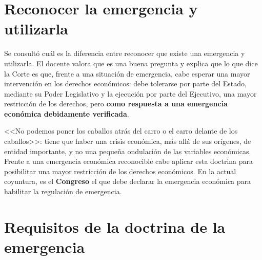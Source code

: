 \documentclass[12pt,oneside]{book}
\begin{document}
\section{Reconocer la emergencia y utilizarla}

Se consultó cuál es la diferencia entre reconocer que existe una emergencia y utilizarla. El docente valora que es una buena pregunta y explica que lo que dice la Corte es que, frente a una situación de emergencia, cabe esperar una mayor intervención en los derechos económicos: debe tolerarse por parte del Estado, mediante su Poder Legislativo y la ejecución por parte del Ejecutivo, una mayor restricción de los derechos, pero \textbf{como respuesta a una emergencia económica debidamente verificada}.

<<No podemos poner los caballos atrás del carro o el carro delante de los caballos>>: tiene que haber una crisis económica, más allá de sus orígenes, de entidad importante, y no una pequeña ondulación de las variables económicas. Frente a una emergencia económica reconocible cabe aplicar esta doctrina para posibilitar una mayor restricción de los derechos económicos. En la actual coyuntura, es el \textbf{Congreso} el que debe declarar la emergencia económica para habilitar la regulación de emergencia.

\section{Requisitos de la doctrina de la emergencia}
\end{document}

